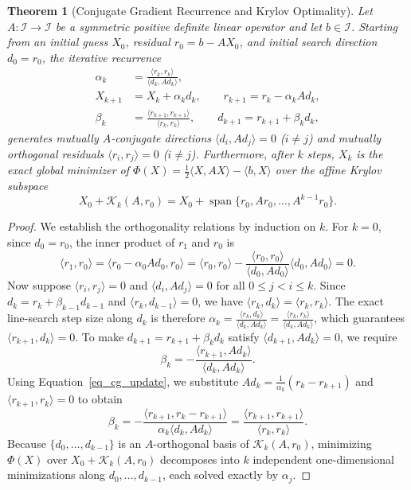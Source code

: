 \documentclass{amsart}
\newtheorem{theorem}{Theorem}[section]
\begin{document}
\begin{theorem}[Conjugate Gradient Recurrence and Krylov Optimality]\label{thm_cg}
    Let $A : \mathcal{I} \to \mathcal{I}$ be a symmetric positive definite linear operator and let $b \in \mathcal{I}$. Starting from an initial guess $X_0$, residual $r_0 = b - A X_0$, and initial search direction $d_0 = r_0$, the iterative recurrence
    \begin{align}
        \alpha_k &= \frac{\langle r_k, r_k \rangle}{\langle d_k, A d_k \rangle}, \label{eq_cg_alpha} \\
        X_{k+1} &= X_k + \alpha_k d_k, \qquad r_{k+1} = r_k - \alpha_k A d_k, \label{eq_cg_update} \\
        \beta_k &= \frac{\langle r_{k+1}, r_{k+1} \rangle}{\langle r_k, r_k \rangle}, \qquad d_{k+1} = r_{k+1} + \beta_k d_k, \label{eq_cg_beta}
    \end{align}
    generates mutually $A$-conjugate directions $\langle d_i, A d_j \rangle = 0$ ($i \neq j$) and mutually orthogonal residuals $\langle r_i, r_j \rangle = 0$ ($i \neq j$). Furthermore, after $k$ steps, $X_k$ is the exact global minimizer of $\Phi(X) = \frac{1}{2}\langle X, A X \rangle - \langle b, X \rangle$ over the affine Krylov subspace
    \[
        X_0 + \mathcal{K}_k(A, r_0) = X_0 + \operatorname{span}\{r_0, A r_0, \dots, A^{k-1} r_0\}.
    \]
\end{theorem}
\begin{proof}
    We establish the orthogonality relations by induction on $k$. For $k = 0$, since $d_0 = r_0$, the inner product of $r_1$ and $r_0$ is
    \[
        \langle r_1, r_0 \rangle = \langle r_0 - \alpha_0 A d_0, r_0 \rangle = \langle r_0, r_0 \rangle - \frac{\langle r_0, r_0 \rangle}{\langle d_0, A d_0 \rangle}\langle d_0, A d_0 \rangle = 0.
    \]
    Now suppose $\langle r_i, r_j \rangle = 0$ and $\langle d_i, A d_j \rangle = 0$ for all $0 \leq j < i \leq k$. Since $d_k = r_k + \beta_{k-1} d_{k-1}$ and $\langle r_k, d_{k-1} \rangle = 0$, we have $\langle r_k, d_k \rangle = \langle r_k, r_k \rangle$. The exact line-search step size along $d_k$ is therefore $\alpha_k = \frac{\langle r_k, d_k \rangle}{\langle d_k, A d_k \rangle} = \frac{\langle r_k, r_k \rangle}{\langle d_k, A d_k \rangle}$, which guarantees $\langle r_{k+1}, d_k \rangle = 0$. To make $d_{k+1} = r_{k+1} + \beta_k d_k$ satisfy $\langle d_{k+1}, A d_k \rangle = 0$, we require
    \[
        \beta_k = -\frac{\langle r_{k+1}, A d_k \rangle}{\langle d_k, A d_k \rangle}.
    \]
    Using Equation~\eqref{eq_cg_update}, we substitute $A d_k = \frac{1}{\alpha_k}(r_k - r_{k+1})$ and $\langle r_{k+1}, r_k \rangle = 0$ to obtain
    \[
        \beta_k = -\frac{\langle r_{k+1}, r_k - r_{k+1} \rangle}{\alpha_k \langle d_k, A d_k \rangle}
        = \frac{\langle r_{k+1}, r_{k+1} \rangle}{\langle r_k, r_k \rangle}.
    \]
    Because $\{d_0, \dots, d_{k-1}\}$ is an $A$-orthogonal basis of $\mathcal{K}_k(A, r_0)$, minimizing $\Phi(X)$ over $X_0 + \mathcal{K}_k(A, r_0)$ decomposes into $k$ independent one-dimensional minimizations along $d_0, \dots, d_{k-1}$, each solved exactly by $\alpha_j$.
\end{proof}
\end{document}
